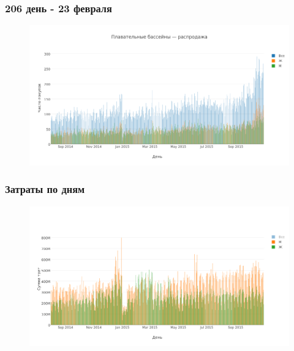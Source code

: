 \documentclass{beamer}
\begin{document}

\begin{frame}
\frametitle{206 день - 23 февраля}

\begin{figure}
    \includegraphics[width=1\linewidth]{pics/swim_23feb.png}
\end{figure}

\end{frame}


\begin{frame}
\frametitle{Затраты по дням}

\begin{figure}
    \includegraphics[width=1\linewidth]{pics/minus.png}
\end{figure}

\end{frame}

\end{document}
